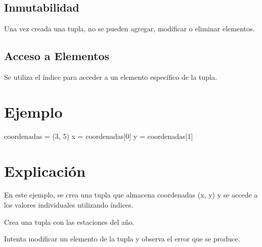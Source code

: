 \documentclass[
  a4paper,
  DIV=11,
  numbers=noendperiod,
  onepage,
  openany]{scrreprt}
\newenvironment{Shaded}{\begin{snugshade}}{\end{snugshade}}
\newcommand{\DecValTok}[1]{\textcolor[rgb]{0.68,0.00,0.00}{#1}}
\newcommand{\NormalTok}[1]{\textcolor[rgb]{0.00,0.23,0.31}{#1}}
\newcommand{\OperatorTok}[1]{\textcolor[rgb]{0.37,0.37,0.37}{#1}}
\begin{document}
\hypertarget{inmutabilidad}{%
\subsection{Inmutabilidad}\label{inmutabilidad}}

Una vez creada una tupla, no se pueden agregar, modificar o eliminar
elementos.

\hypertarget{acceso-a-elementos-2}{%
\subsection{Acceso a Elementos}\label{acceso-a-elementos-2}}

Se utiliza el índice para acceder a un elemento específico de la tupla.

\hypertarget{ejemplo-20}{%
\section{Ejemplo}\label{ejemplo-20}}

\begin{Shaded}
\begin{Highlighting}[]
\NormalTok{coordenadas }\OperatorTok{=}\NormalTok{ (}\DecValTok{3}\NormalTok{, }\DecValTok{5}\NormalTok{)}
\NormalTok{x }\OperatorTok{=}\NormalTok{ coordenadas[}\DecValTok{0}\NormalTok{]}
\NormalTok{y }\OperatorTok{=}\NormalTok{ coordenadas[}\DecValTok{1}\NormalTok{]}
\end{Highlighting}
\end{Shaded}

\hypertarget{explicaciuxf3n-20}{%
\section{Explicación}\label{explicaciuxf3n-20}}

En este ejemplo, se crea una tupla que almacena coordenadas (x, y) y se
accede a los valores individuales utilizando índices.

\begin{tcolorbox}[enhanced jigsaw, colbacktitle=quarto-callout-important-color!10!white, toprule=.15mm, leftrule=.75mm, titlerule=0mm, opacityback=0, rightrule=.15mm, opacitybacktitle=0.6, breakable, left=2mm, coltitle=black, title=\textcolor{quarto-callout-important-color}{\faExclamation}\hspace{0.5em}{Actividad Práctica:}, toptitle=1mm, bottomtitle=1mm, arc=.35mm, bottomrule=.15mm, colback=white, colframe=quarto-callout-important-color-frame]

Crea una tupla con las estaciones del año.

Intenta modificar un elemento de la tupla y observa el error que se
produce.

\end{tcolorbox}
\end{document}
